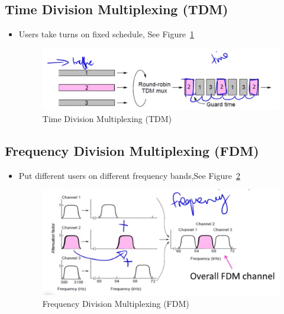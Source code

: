 \documentclass[12pt]{ctexart}   %
\begin{document}
	\subsection{Time Division Multiplexing (TDM)}
	\begin{itemize}
		\item Users take turns on fixed schedule, See Figure~\ref{fig:3-3-1}
		
		\begin{figure}[h!] %
		\centering
		 \includegraphics[scale=0.7]{images/3-3-1}
		\caption{Time Division Multiplexing (TDM)}
		 \label{fig:3-3-1}
		 \end{figure}
	\end{itemize}
	
	\subsection{Frequency Division Multiplexing (FDM)}
	\begin{itemize}
		\item Put different users on different frequency bands,See Figure~\ref{fig:3-3-2}
		
		\begin{figure}[h!] %
		\centering
		 \includegraphics[scale=0.7]{images/3-3-2}
		\caption{Frequency Division Multiplexing (FDM)}
		 \label{fig:3-3-2}
		 \end{figure}
	\end{itemize}
	
\end{document}
